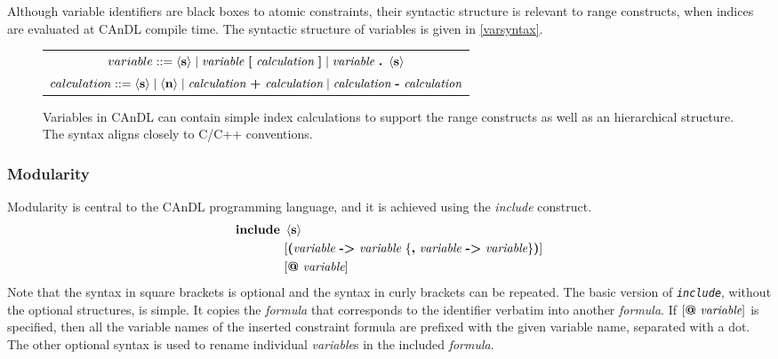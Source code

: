     Although variable identifiers are black boxes to atomic constraints, their
    syntactic structure is relevant to range constructs, when indices are
    evaluated at CAnDL compile time.
    The syntactic structure of variables is given in \autoref{varsyntax}.

\begin{figure}[b]
  \centering
  \begin{tabular}{|c|}
    \hline
    $variable ::= \left<\text{\bf s}\right>\mid\text{\it variable}\ \text{\bf [}\ \text{\it calculation}\ \text{\bf ]}\mid\text{\it variable}\ \text{\bf.}\ \left<\text{\bf s}\right>$\\
    $calculation ::= \left<\text{\bf s}\right>\mid\left<\text{\bf n}\right>\mid\text{\it calculation}\ \text{\bf+}\ \text{\it calculation}\mid\text{\it calculation}\ \text{\bf-}\ \text{\it calculation}$\\
    \hline
  \end{tabular}
  \caption{Variables in CAnDL can contain simple index calculations to support
           the range constructs as well as an hierarchical structure.
           The syntax aligns closely to C/C++ conventions.}
  \label{varsyntax}
\end{figure}





\subsubsection{Modularity}
    \label{sec:modularity}

    Modularity is central to the CAnDL programming language, and it is achieved
    using the {\it include} construct.
    \begin{align*}
        \text{\bf include}\ &\left<\text{\bf s}\right>\\
                            &[\text{\bf (}\text{\it variable}\ \text{\bf ->}\ \text{\it variable}\ \{\text{\bf ,}\ \text{\it variable}\ \text{\bf ->}\ \text{\it variable}\}\text{\bf )}]\\
                            &[\text{\bf @}\ \text{\it variable}]
    \end{align*}
    Note that the syntax in square brackets is optional and the syntax in curly
    brackets can be repeated.
    The basic version of \texttt{\it include}, without the optional structures,
    is simple.
    It copies the {\it formula} that corresponds to the identifier verbatim into
    another {\it formula}.
    If $[\text{\bf @}\ \text{\it variable}]$ is specified, then all the variable
    names of the inserted constraint formula are prefixed with the given
    variable name, separated with a dot.
    The other optional syntax is used to rename individual {\it variable}s in
    the included {\it formula}.

